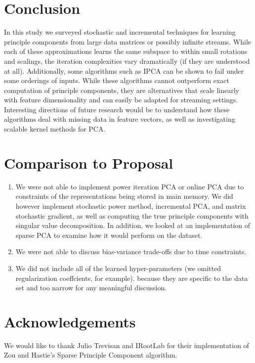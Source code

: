 \documentclass[11pt,letterpaper]{article}
\begin{document}
\section{Conclusion}

In this study we surveyed stochastic and incremental techniques for learning principle components from large data matrices or possibly infinite streams. While each of these approximations learns the same subspace to within small rotations and scalings, the iteration complexities vary dramatically (if they are understood at all). Additionally, some algorithms such as IPCA can be shown to fail under some orderings of inputs. While these algorithms cannot outperform exact computation of principle components, they are alternatives that scale linearly with feature dimensionality and can easily be adapted for streaming settings. Interesting directions of future research would be to understand how these algorithms deal with missing data in feature vectors, as well as investigating scalable kernel methods for PCA.

\section{Comparison to Proposal}
\begin{enumerate}
\item We were not able to implement power iteration PCA or online PCA due to constraints of the representations being stored in main memory. We did however implement stochastic power method, incremental PCA, and matrix stochastic gradient, as well as computing the true principle components with singular value decomposition. In addition, we looked at an implementation of sparse PCA to examine how it would perform on the dataset.
\item We were not able to discuss bias-variance trade-offs due to time constraints. 
\item We did not include all of the learned hyper-parameters (we omitted regularization coeffcients, for example). because they are specific to the data set and too narrow for any meaningful discussion.
\end{enumerate}

\section{Acknowledgements}

We would like to thank Julio Trevisan and IRootLab for their implementation of Zou and Hastie's Sparse Principle Component algorithm. 
\end{document}
